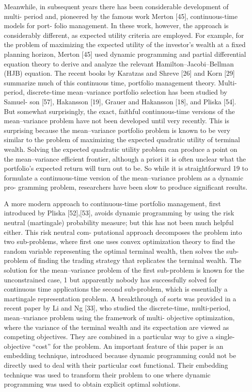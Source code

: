 Meanwhile, in subsequent years there has been considerable development of multi- period and, pioneered by the famous work Merton [45], continuous-time models for port- folio management. In these work, however, the approach is considerably different, as expected utility criteria are employed. For example, for the problem of maximizing the expected utility of the investor’s wealth at a fixed planning horizon, Merton [45] used dynamic programming and partial differential equation theory to derive and analyze the relevant Hamilton–Jacobi–Bellman (HJB) equation. The recent books by Karatzas and Shreve [26] and Korn [29] summarize much of this continuous time, portfolio management theory.
Multi-period, discrete-time mean–variance portfolio selection has been studied by Samuel- son [57], Hakansson [19], Grauer and Hakansson [18], and Pliska [54]. But somewhat surprisingly, the exact, faithful continuous-time versions of the mean–variance problem have not been developed until very recently. This is surprising because the mean–variance portfolio problem is known to be very similar to the problem of maximizing the expected quadratic utility of terminal wealth. Solving the expected quadratic utility problem can produce a point on the mean–variance efficient frontier, although a priori it is often unclear what the portfolio’s expected return will turn out to be. So while it is straightforward
19
to formulate a continuous-time version of the mean–variance problem as a dynamic pro- gramming problem, researchers have been slow to produce significant results.

A more modern approach to continuous-time portfolio management, first introduced by Pliska [52],[53], avoids dynamic programming by using the risk neutral (martingale) probability measure; but this has not been much helpful either. This risk neutral com- putational approach decomposes the problem into two sub-problems, where first one uses convex optimization theory to find the random variable representing the optimal terminal wealth, then solves the sub-problem of finding the trading strategy that replicates the terminal wealth. The solution for the mean–variance problem of the first sub-problem is known for the unconstrained case, 1 but apparently nobody has successfully solved for continuous time applications the second sub-problem, which is essentially a martingale representation problem.
A breakthrough of sorts was provided in a recent paper by Li and Ng [33], who studied the discrete-time, multi-period, mean–variance problem using the framework of multi- objective optimization, where the variance of the terminal wealth and its expectation are viewed as competing objectives. They are combined in a particular way to give a single- objective “cost” for the problem. An important feature of this paper is an embedding technique, introduced because dynamic programming could not be directly used to deal with their particular cost functional. Their embedding technique was used to transform their problem to one where dynamic programming was used to obtain explicit optimal solutions.

